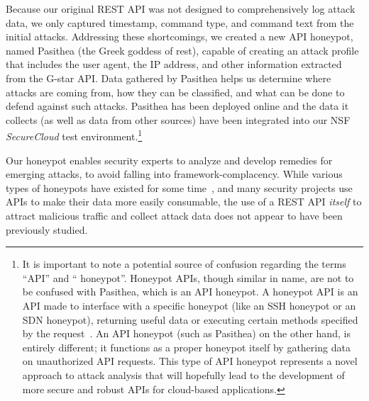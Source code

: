 Because our original REST API was not designed to comprehensively log attack data, we only captured timestamp, command type, and command text from the initial attacks.  
Addressing these shortcomings, we created a new API honeypot, named Pasithea (the Greek goddess of rest), capable of creating an attack profile that includes the user agent, the IP address, and other information extracted from the G-star API.
Data gathered by Pasithea helps us determine where attacks are coming from, how they can be classified, and what can be done to defend against such attacks.  
Pasithea has been deployed online and the data it collects (as well as data from other sources) have been integrated into our NSF {\em SecureCloud} test environment.\footnote{  
It is important to note a potential source of confusion regarding the terms ``API'' and `` honeypot''. 
Honeypot APIs, though similar in name, are not to be confused with Pasithea, which is an API honeypot. 
A honeypot API is an API made to interface with a specific honeypot (like an SSH honeypot or an SDN honeypot), returning useful data or executing certain methods specified by the request~\cite{Honeypot-API}. 
An API honeypot (such as Pasithea) on the other hand, is entirely different; it functions as a proper honeypot itself by gathering data on unauthorized API requests.  
This type of API honeypot represents a novel approach to attack analysis that will hopefully lead to the development of more secure and robust APIs for cloud-based applications.}  

Our honeypot enables security experts to analyze and develop remedies for emerging attacks, to avoid falling into framework-complacency.  
While various types of honeypots have existed for some time~\cite{Stoll:1989:CET:67554,Provos:2004:VHF:1251375.1251376}, and many security projects use APIs to make their data more easily consumable,
the use of a REST API {\em itself} to attract malicious traffic and collect attack data does not appear to have been previously studied.

